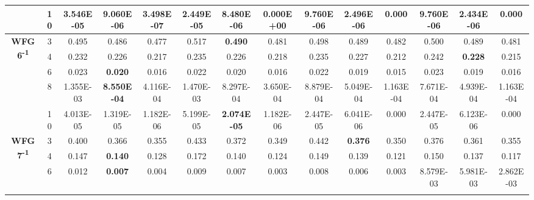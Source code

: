 \documentclass[onecolumn,10pt]{asme2ej}
\begin{document}
\begin{table}[!htb]
\begin{tabular}{|c|c|c|c|c|c|c|c|c|c|c|c|c|c|}
	& 10         & 3.546E-05     & \textbf{9.060E-06} & 3.498E-07      & 2.449E-05     & 8.480E-06          & 0.000E+00      & 9.760E-06     & 2.496E-06          & 0.000          & 9.760E-06     & 2.434E-06          & 0.000          \\ \hline
	\multirow{5}{*}{\textbf{WFG6\textsuperscript{-1}}} & 3          & 0.495         & 0.486              & 0.477          & 0.517         & \textbf{0.490}     & 0.481          & 0.498         & 0.489              & 0.482          & 0.500         & 0.489              & 0.481          \\ \cline{2-14} 
	& 4          & 0.232         & 0.226              & 0.217          & 0.235         & 0.226              & 0.218          & 0.235         & 0.227              & 0.212          & 0.242         & \textbf{0.228}     & 0.215          \\ \cline{2-14} 
	& 6          & 0.023         & \textbf{0.020}     & 0.016          & 0.022         & 0.020              & 0.016          & 0.022         & 0.019              & 0.015          & 0.023         & 0.019              & 0.016          \\ \cline{2-14} 
	& 8          & 1.355E-03     & \textbf{8.550E-04} & 4.116E-04      & 1.470E-03     & 8.297E-04          & 3.650E-04      & 8.879E-04     & 5.049E-04          & 1.163E-04      & 7.671E-04     & 4.939E-04          & 1.163E-04      \\ \cline{2-14} 
	& 10         & 4.013E-05     & 1.319E-05          & 1.182E-06      & 5.199E-05     & \textbf{2.074E-05} & 1.182E-06      & 2.447E-05     & 6.041E-06          & 0.000          & 2.447E-05     & 6.123E-06          & 0.000          \\ \hline
	\multirow{5}{*}{\textbf{WFG7\textsuperscript{-1}}} & 3          & 0.400         & 0.366              & 0.355          & 0.433         & 0.372              & 0.349          & 0.442         & \textbf{0.376}     & 0.350          & 0.376         & 0.361              & 0.355          \\ \cline{2-14} 
	& 4          & 0.147         & \textbf{0.140}     & 0.128          & 0.172         & 0.140              & 0.124          & 0.149         & 0.139              & 0.121          & 0.150         & 0.137              & 0.117          \\ \cline{2-14} 
	& 6          & 0.012         & \textbf{0.007}     & 0.004          & 0.009         & 0.007              & 0.003          & 0.008         & 0.006              & 0.003          & 8.579E-03     & 5.981E-03          & 2.862E-03      \\ \cline{2-14} 

\end{tabular}
\end{table}
\end{document}
